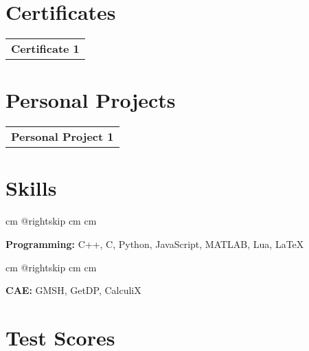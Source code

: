 \documentclass[10pt, a4paper]{article}
\begin{document}
    \section{Certificates}
    
        \begin{tabularx}{ cm-0.13cm}{K{0.2 cm}}
            \textbf{Certificate 1}
            \vspace*{0.12 cm}
        \end{tabularx}



    \section{Personal Projects}
    
        \begin{tabularx}{ cm-0.13cm}{K{0.2 cm}}
            \textbf{Personal Project 1}
            \vspace*{0.12 cm}
        \end{tabularx}



    \section{Skills}
    
            \begingroup\raggedright
             cm
            \advance\csname @rightskip cm
            \advance{} cm

            \textbf{Programming:} C++, C, Python, JavaScript, MATLAB, Lua, LaTeX

            \par\endgroup

        \vspace*{0.12 cm}
        
            \begingroup\raggedright
             cm
            \advance\csname @rightskip cm
            \advance{} cm

            \textbf{CAE:} GMSH, GetDP, CalculiX

            \par\endgroup



    \section{Test Scores}
    
\end{document}
